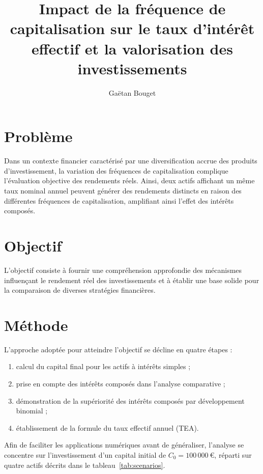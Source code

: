 \documentclass{article}
\title{Impact de la fréquence de capitalisation sur le taux d'intérêt effectif et la valorisation des investissements}
\author{Gaëtan Bouget}
\begin{document}
\maketitle

\section{Problème}
Dans un contexte financier caractérisé par une diversification accrue des produits d’investissement, la variation des fréquences de capitalisation complique l’évaluation objective des rendements réels. Ainsi, deux actifs affichant un même taux nominal annuel peuvent générer des rendements distincts en raison des différentes fréquences de capitalisation, amplifiant ainsi l'effet des intérêts composés.

\section{Objectif}
L'objectif consiste à fournir une compréhension approfondie des mécanismes influençant le rendement réel des investissements et à établir une base solide pour la comparaison de diverses stratégies financières.

\section{Méthode}
L'approche adoptée pour atteindre l'objectif se décline en quatre étapes :
\begin{enumerate}
    \item calcul du capital final pour les actifs à intérêts simples ;
    \item prise en compte des intérêts composés dans l’analyse comparative ;
    \item démonstration de la supériorité des intérêts composés par développement binomial ;
    \item établissement de la formule du taux effectif annuel (TEA).
\end{enumerate}

Afin de faciliter les applications numériques avant de généraliser, l'analyse se concentre sur l'investissement d'un capital initial de \( C_0 = 100\,000\ \text{€} \), réparti sur quatre actifs décrits dans le tableau~\ref{tab:scenarios}.
\end{document}
